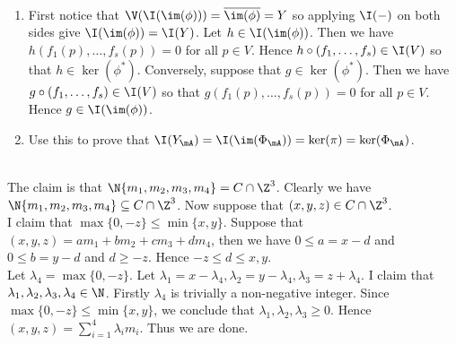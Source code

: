 \documentclass[a4paper]{article}
\begin{document}
\begin{ex}{}{}\\
\end{ex}

\begin{ex}{}{}\\
\end{ex}

\begin{ex}{}{}\\
\begin{enumerate}[label=(\alph*)]
\item First notice that $\V(\I(\im(\phi)))=\overline{\im(\phi)}=Y$ so applying $\I(-)$ on both sides give $\I(\im(\phi))=\I(Y)$. Let $h\in\I(\im(\phi))$. Then we have $h(f_1(p),\dots,f_s(p))=0$ for all $p\in V$. Hence $h\circ(f_1,\dots,f_s)\in\I(V)$ so that $h\in\ker(\phi^\ast)$. Conversely, suppose that $g\in\ker(\phi^\ast)$. Then we have $g\circ(f_1,\dots,f_s)\in\I(V)$ so that $g(f_1(p),\dots,f_s(p))=0$ for all $p\in V$. Hence $g\in\I(\im(\phi))$. 
\item Use this to prove that $\I(Y_\mA)=\I(\im(\Phi_\mA))=\ker(\pi)=\ker(\Phi_\mA)$. 
\end{enumerate}
\end{ex}

\begin{ex}{}{}\\
The claim is that $\N\{m_1,m_2,m_3,m_4\}=C\cap\Z^3$. Clearly we have $\N\{m_1,m_2,m_3,m_4\}\subseteq C\cap\Z^3$. Now suppose that $(x,y,z)\in C\cap\Z^3$. \\

I claim that $\max\{0,-z\}\leq\min\{x,y\}$. Suppose that $(x,y,z)=am_1+bm_2+cm_3+dm_4$, then we have $0\leq a=x-d$ and $0\leq b=y-d$ and $d\geq -z$. Hence $-z\leq d\leq x,y$. \\

Let $\lambda_4=\max\{0,-z\}$. Let $\lambda_1=x-\lambda_4,\lambda_2=y-\lambda_4,\lambda_3=z+\lambda_4$. I claim that $\lambda_1,\lambda_2,\lambda_3,\lambda_4\in\N$. Firstly $\lambda_4$ is trivially a non-negative integer. Since $\max\{0,-z\}\leq\min\{x,y\}$, we conclude that $\lambda_1,\lambda_2,\lambda_3\geq 0$. Hence $(x,y,z)=\sum_{i=1}^4\lambda_im_i$. Thus we are done. 
\end{ex}
\end{document}
